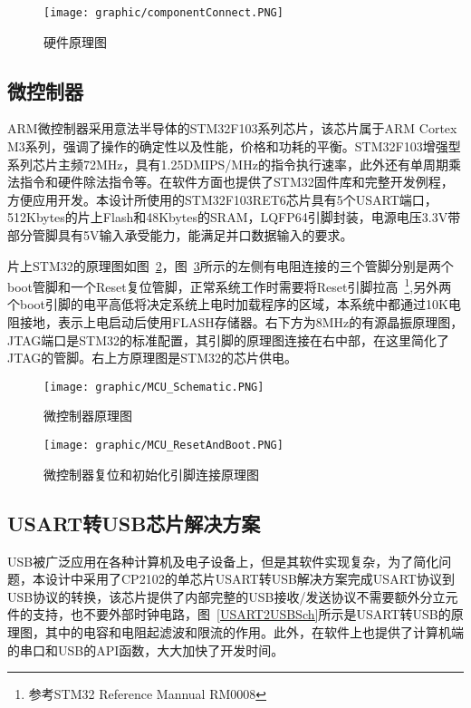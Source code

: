 \begin{figure}[!hbp]
\begin{center}
\texttt{[image: graphic/componentConnect.PNG]}
\caption{硬件原理图 \label{ComponentConn}}
\end{center}
\end{figure}

\subsection{微控制器}
	ARM微控制器采用意法半导体的STM32F103系列芯片，该芯片属于ARM Cortex M3系列，强调了操作的确定性以及性能，价格和功耗的平衡。STM32F103增强型系列芯片主频72MHz，具有1.25DMIPS/MHz的指令执行速率，此外还有单周期乘法指令和硬件除法指令等。在软件方面也提供了STM32固件库和完整开发例程，方便应用开发。本设计所使用的STM32F103RET6芯片具有5个USART端口，512Kbytes的片上Flash和48Kbytes的SRAM，LQFP64引脚封装，电源电压3.3V带部分管脚具有5V输入承受能力，能满足并口数据输入的要求。

	片上STM32的原理图如图~\ref{MCUSche}，图~\ref{MCUScheResetBoot}所示的左侧有电阻连接的三个管脚分别是两个boot管脚和一个Reset复位管脚，正常系统工作时需要将Reset引脚拉高~\footnote{参考STM32 Reference Mannual RM0008},另外两个boot引脚的电平高低将决定系统上电时加载程序的区域，本系统中都通过10K电阻接地，表示上电启动后使用FLASH存储器。右下方为8MHz的有源晶振原理图，JTAG端口是STM32的标准配置，其引脚的原理图连接在右中部，在这里简化了JTAG的管脚。右上方原理图是STM32的芯片供电。

\begin{figure}[!hbp]
\begin{center}
\texttt{[image: graphic/MCU\_Schematic.PNG]}
\caption{微控制器原理图 \label{MCUSche}}
\end{center}
\end{figure}

\begin{figure}[!hbp]
\begin{center}
\texttt{[image: graphic/MCU\_ResetAndBoot.PNG]}
\caption{微控制器复位和初始化引脚连接原理图 \label{MCUScheResetBoot}}
\end{center}
\end{figure}

\subsection{USART转USB芯片解决方案}
	USB被广泛应用在各种计算机及电子设备上，但是其软件实现复杂，为了简化问题，本设计中采用了CP2102的单芯片USART转USB解决方案完成USART协议到USB协议的转换，该芯片提供了内部完整的USB接收/发送协议不需要额外分立元件的支持，也不要外部时钟电路，图~\ref{USART2USBSch}所示是USART转USB的原理图，其中的电容和电阻起滤波和限流的作用。此外，在软件上也提供了计算机端的串口和USB的API函数，大大加快了开发时间。

